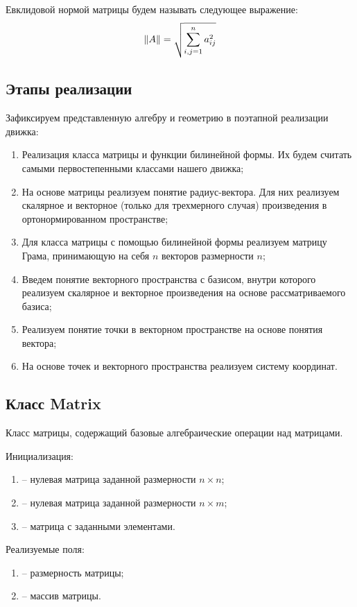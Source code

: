 	Евклидовой нормой матрицы будем называть следующее выражение:
	\[ \left\Vert A \right\Vert = \sqrt{\sum_{i, j = 1}^{n} a_{ij}^2} \]


\subsection{Этапы реализации}

	Зафиксируем представленную алгебру и геометрию в поэтапной реализации движка:
	\begin{enumerate}
		\item Реализация класса матрицы и функции билинейной формы. Их будем считать самыми первостепенными классами нашего движка;
		\item На основе матрицы реализуем понятие радиус-вектора. Для них реализуем скалярное и векторное (только для трехмерного случая) произведения в ортонормированном пространстве;
		\item Для класса матрицы с помощью билинейной формы реализуем матрицу Грама, принимающую на себя $n$ векторов размерности $n$;
		\item Введем понятие векторного пространства с базисом, внутри которого реализуем скалярное и векторное произведения на основе рассматриваемого базиса;
		\item Реализуем понятие точки в векторном пространстве на основе понятия вектора;
		\item На основе точек и векторного пространства реализуем систему координат.
	\end{enumerate}


\subsection{Класс Matrix}
	\noindent Класс матрицы, содержащий базовые алгебраические операции над матрицами.

	\noindent Инициализация:
	\begin{enumerate}
		\item {} -- нулевая матрица заданной размерности \( n \times n \);
		\item {} -- нулевая матрица заданной размерности \( n \times m \);
		\item {} -- матрица с заданными элементами.
	\end{enumerate}

	\noindent Реализуемые поля:
	\begin{enumerate}
		\item {} -- размерность матрицы;
		\item {} -- массив матрицы.
	\end{enumerate}

